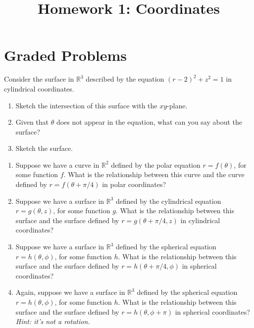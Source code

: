 \documentclass{ximera}
\title{Homework 1: Coordinates}
\begin{document}
\begin{abstract}
\end{abstract}
\maketitle

\section*{Graded Problems}

\begin{problem}
Consider the surface in $\mathbb{R}^3$ described by the equation $(r-2)^2+z^2=1$ in cylindrical coordinates.
\begin{enumerate}
\item Sketch the intersection of this surface with the $xy$-plane.
\item Given that $\theta$ does not appear in the equation, what can you say about the surface?
\item Sketch the surface.
\end{enumerate}
\end{problem}

\begin{problem}
\begin{enumerate}
\item Suppose we have a curve in $\mathbb{R}^2$ defined by the polar equation $r=f(\theta)$, for some function $f$. What is the relationship between this curve and the curve defined by $r=f(\theta+\pi/4)$ in polar coordinates?
\item Suppose we have a surface in $\mathbb{R}^3$ defined by the cylindrical equation $r=g(\theta, z)$, for some function $g$. What is the relationship between this surface and the surface defined by $r=g(\theta + \pi/4, z)$ in cylindrical coordinates?
\item Suppose we have a surface in $\mathbb{R}^3$ defined by the spherical equation $r=h(\theta, \phi)$, for some function $h$. What is the relationship between this surface and the surface defined by $r=h(\theta + \pi/4, \phi)$ in spherical coordinates?
\item Again, suppose we have a surface in $\mathbb{R}^3$ defined by the spherical equation $r=h(\theta, \phi)$, for some function $h$. What is the relationship between this surface and the surface defined by $r=h(\theta,\phi+\pi)$ in spherical coordinates? \emph{Hint: it's not a rotation.}
\end{enumerate}
\end{problem}
\end{document}
